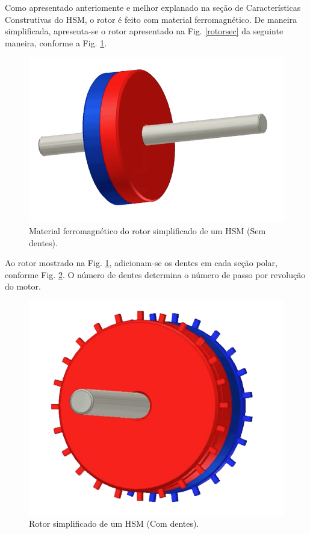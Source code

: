 	Como apresentado anteriomente e melhor explanado na seção de Características Construtivas do HSM, o rotor é feito com material ferromagnético. De maneira simplificada, apresenta-se o rotor apresentado na Fig. \ref{rotorsec} da seguinte maneira, conforme a Fig. \ref{rotor1}.
	
	\begin{figure}[H]
		\centering 
		\includegraphics[scale=0.2]{images/hsm_operation/rotormag1}
		\caption{Material ferromagnético do rotor simplificado de um HSM (Sem dentes).}
		\label{rotor1}
	\end{figure}
	
	Ao rotor mostrado na Fig. \ref{rotor1}, adicionam-se os dentes em cada seção polar, conforme Fig. \ref{rotor2}. O número de dentes determina o número de passo por revolução do motor.
	
	\begin{figure}[H]
		\centering 
		\includegraphics[scale=0.2]{images/hsm_operation/rotormag2}
		\caption{Rotor simplificado de um HSM (Com dentes).}
		\label{rotor2}
	\end{figure}
	
